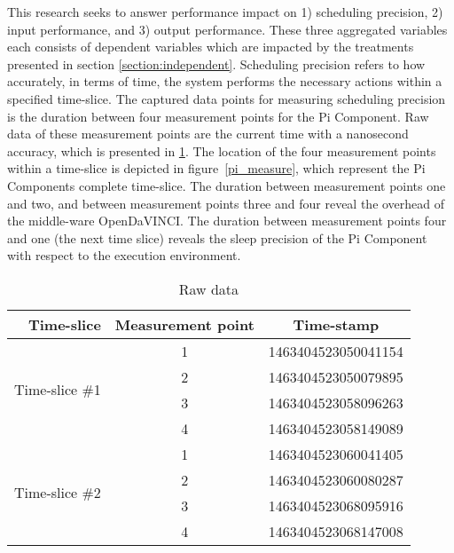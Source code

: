This research seeks to answer performance impact on 1) scheduling precision, 2) input performance, and 3) output performance. These three aggregated variables each consists of dependent variables which are impacted by the treatments presented in section \ref{section:independent}. Scheduling precision refers to how accurately, in terms of time, the system performs the necessary actions within a specified time-slice. The captured data points for measuring scheduling precision is the duration between four measurement points for the Pi Component. Raw data of these measurement points are the current time with a nanosecond accuracy, which is presented in \ref{table:measurement}. The location of the four measurement points within a time-slice is depicted in figure~\ref{pi_measure}, which represent the Pi Components complete time-slice. The duration between measurement points one and two, and between measurement points three and four reveal the overhead of the middle-ware OpenDaVINCI. The duration between measurement points four and one (the next time slice) reveals the sleep precision of the Pi Component with respect to the execution environment.\\ 



\begin{table}[ht]
\begin{tabular}{|r|c|c|}
\hline
\textbf{Time-slice}  				&\textbf{Measurement point} 	& \textbf{Time-stamp}  \\ \hline
\multirow{4}{*}[-.1em]{Time-slice \#1}& 1							& 1463404523050041154  \\ \cline{2-3}
									& 2								& 1463404523050079895  \\ \cline{2-3}
									& 3								& 1463404523058096263  \\ \cline{2-3}
									& 4								& 1463404523058149089  \\ \hline
\multirow{4}{*}[-.1em]{Time-slice \#2}& 1							& 1463404523060041405  \\ \cline{2-3}
									& 2								& 1463404523060080287  \\ \cline{2-3}
									& 3								& 1463404523068095916  \\ \cline{2-3}
									& 4								& 1463404523068147008  \\ \hline
\end{tabular}
\centering
\caption{Raw data}
\label{table:measurement}
\end{table}

